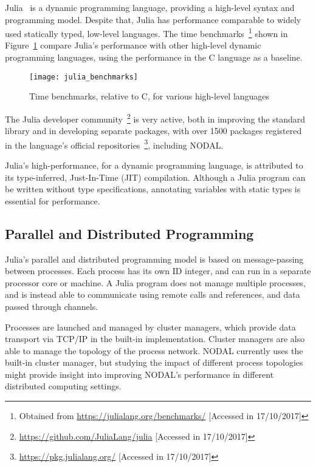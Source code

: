 Julia~\cite{bezanson2012julia,bezanson2014julia} is a dynamic programming
language, providing a high-level syntax and programming model.  Despite that,
Julia has performance comparable to widely used statically typed, low-level
languages. The time benchmarks~\footnote{Obtained from
\url{https://julialang.org/benchmarks/} [Accessed in 17/10/2017]} shown in
Figure~\ref{fig:julia_benchmarks} compare Julia's performance with other
high-level dynamic programming languages, using the performance in the C
language as a baseline.

\begin{figure}[htpb]
    \centering
    \texttt{[image: julia\_benchmarks]}
    \caption{Time benchmarks, relative to C, for various high-level languages}
    \label{fig:julia_benchmarks}
\end{figure}

The Julia developer community~\footnote{\url{https://github.com/JuliaLang/julia} [Accessed in
17/10/2017]} is very active, both in improving the standard library
and in developing separate packages, with over 1500 packages registered
in the language's official
repositories~\footnote{\url{https://pkg.julialang.org/} [Accessed in
17/10/2017]}, including NODAL.

Julia's high-performance, for a dynamic programming language, is attributed to
its type-inferred, Just-In-Time (JIT) compilation. Although a Julia program
can be written without type specifications, annotating variables with static
types is essential for performance.

\subsection{Parallel and Distributed Programming}
\label{sec:parallel-julia}

Julia's parallel and distributed programming model is based on message-passing
between processes. Each process has its own ID integer, and can run in a
separate processor core or machine. A Julia program does not manage multiple
processes, and is instead able to communicate using remote calls and
references, and data passed through channels.

Processes are launched and managed by cluster managers, which provide data
transport via TCP/IP in the built-in implementation. Cluster managers are also
able to manage the topology of the process network. NODAL currently uses the
built-in cluster manager, but studying the impact of different process
topologies might provide insight into improving NODAL's performance in
different distributed computing settings.


